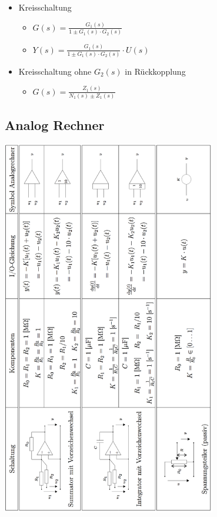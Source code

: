 \begin{multicols}{2}
\begin{itemize}
\item Kreisschaltung
\begin{itemize}
	\item $G(s) = \frac{G_1(s)}{1\pm G_1(s)\cdot G_2(s)}$
	\item $Y(s) = \frac{G_1(s)}{1\pm G_1(s)\cdot G_2(s)} \cdot U(s)$
\end{itemize}

\item Kreisschaltung ohne $G_2(s)$ in Rückkopplung
\begin{itemize}
	\item $G(s) = \frac{Z_1(s)}{N_1(s)\pm Z_1(s)}$
\end{itemize}

\end{itemize}
\end{multicols}

\subsection{Analog Rechner }
	\begin{center}
	\includegraphics[width=0.7\textwidth]{./images/AnalogRechner}
	\end{center}

